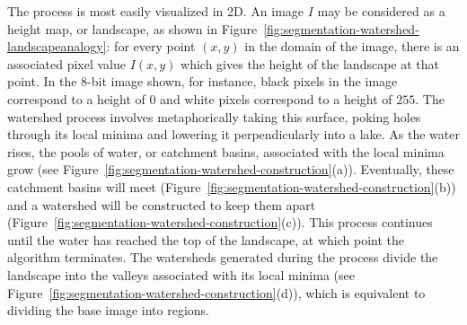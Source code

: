 
The process is most easily visualized in 2D. An image $I$ may be considered as a height map, or landscape, as shown in Figure~\ref{fig:segmentation-watershed-landscapeanalogy}: for every point $(x,y)$ in the domain of the image, there is an associated pixel value $I(x,y)$ which gives the height of the landscape at that point. In the 8-bit image shown, for instance, black pixels in the image correspond to a height of $0$ and white pixels correspond to a height of $255$. The watershed process involves metaphorically taking this surface, poking holes through its local minima and lowering it perpendicularly into a lake. As the water rises, the pools of water, or catchment basins, associated with the local minima grow (see Figure~\ref{fig:segmentation-watershed-construction}(a)). Eventually, these catchment basins will meet (Figure~\ref{fig:segmentation-watershed-construction}(b)) and a watershed will be constructed to keep them apart (Figure~\ref{fig:segmentation-watershed-construction}(c)). This process continues until the water has reached the top of the landscape, at which point the algorithm terminates. The watersheds generated during the process divide the landscape into the valleys associated with its local minima (see Figure~\ref{fig:segmentation-watershed-construction}(d)), which is equivalent to dividing the base image into regions.

